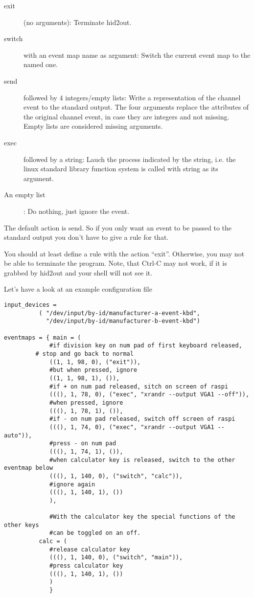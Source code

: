 \begin{description}
  \begin{description}
  \item[exit] (no arguments):
    Terminate hid2out.
  \item[switch] with an event map name as argument:
    Switch the current event map to the named one.
  \item[send] followed by 4 integers/empty lists:
    Write a representation of the channel event to the 
    standard output. The four arguments replace the
    attributes of the original channel event,
    in case they are integers and not missing.
    Empty lists are considered missing arguments.
  \item[exec] followed by a string:
    Lauch the process indicated by the string, i.e. the linux standard library function system is 
    called with string as its argument.
  \item[An empty list]:
    Do nothing, just ignore the event.
  \end{description}
  
  The default action is send. So if you only want an event
  to be passed to the standard output you don't have to
  give a rule for that.

  You should at least define a rule with the action ``exit''.
  Otherwise, you may not be able to terminate the program.
  Note, that Ctrl-C may not work, if it is grabbed by 
  hid2out and your shell will not see it.
\end{description}

Let's have a look at an example configuration file

\begin{verbatim}
input_devices =
	      (	"/dev/input/by-id/manufacturer-a-event-kbd",
	        "/dev/input/by-id/manufacturer-b-event-kbd")

eventmaps = { main = (
	      	 #if division key on num pad of first keyboard released,
		 # stop and go back to normal
	      	 ((1, 1, 98, 0), ("exit")),
	      	 #but when pressed, ignore
	      	 ((1, 1, 98, 1), ()),
 	      	 #if + on num pad released, sitch on screen of raspi
	      	 (((), 1, 78, 0), ("exec", "xrandr --output VGA1 --off")),
	      	 #when pressed, ignore
	      	 (((), 1, 78, 1), ()),
 	      	 #if - on num pad released, switch off screen of raspi
	      	 (((), 1, 74, 0), ("exec", "xrandr --output VGA1 --auto")),
	      	 #press - on num pad 
	      	 (((), 1, 74, 1), ()),
	      	 #when calculator key is released, switch to the other eventmap below
	      	 (((), 1, 140, 0), ("switch", "calc")),
	      	 #ignore again
	      	 (((), 1, 140, 1), ())
	      	 ),

	      	 #With the calculator key the special functions of the other keys
	      	 #can be toggled on an off.
	      calc = (
	      	 #release calculator key
	      	 (((), 1, 140, 0), ("switch", "main")),
	      	 #press calculator key
	      	 (((), 1, 140, 1), ())
	      	 )   
	      	 }  
\end{verbatim}

